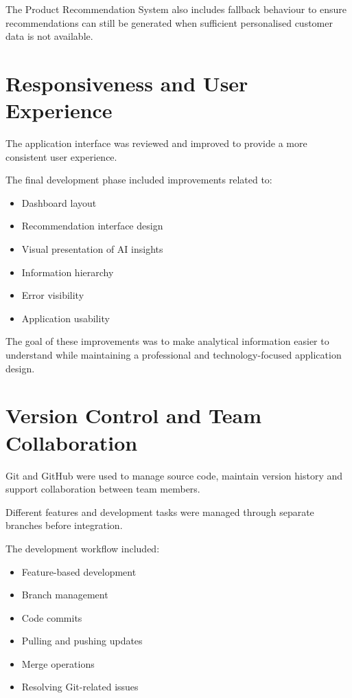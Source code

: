 \documentclass[12pt,a4paper]{report}
\begin{document}
The Product Recommendation System also includes fallback behaviour to
ensure recommendations can still be generated when sufficient
personalised customer data is not available.



\section{Responsiveness and User Experience}

The application interface was reviewed and improved to provide a more
consistent user experience.

The final development phase included improvements related to:

\begin{itemize}
    \item Dashboard layout
    \item Recommendation interface design
    \item Visual presentation of AI insights
    \item Information hierarchy
    \item Error visibility
    \item Application usability
\end{itemize}

The goal of these improvements was to make analytical information easier
to understand while maintaining a professional and technology-focused
application design.



\section{Version Control and Team Collaboration}

Git and GitHub were used to manage source code, maintain version
history and support collaboration between team members.

Different features and development tasks were managed through separate
branches before integration.

The development workflow included:

\begin{itemize}
    \item Feature-based development
    \item Branch management
    \item Code commits
    \item Pulling and pushing updates
    \item Merge operations
    \item Resolving Git-related issues
\end{itemize}
\end{document}
